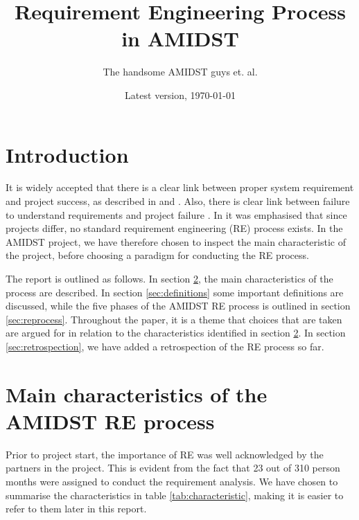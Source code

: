 \documentclass[11pt, oneside]{article}   	%
\title{Requirement Engineering Process in AMIDST}
\author{The handsome AMIDST guys et. al.}
\date{Latest version, \today}							%
\begin{document}
\maketitle
%
%
\section{Introduction}

It is widely accepted that there is a clear link between proper system requirement and project success, as described in  \cite{Boe91} and \cite{Jac99}.  Also, there is clear link between failure to understand requirements and project failure \cite{Ewu03}.  
In \cite{Ebe10} it was emphasised that since projects differ, no standard requirement engineering (RE) process exists.  In the AMIDST project, we have therefore chosen to inspect the main characteristic of the project, before choosing a paradigm for conducting the RE process.

The report is outlined as follows.  In section \ref{sec:characteristic}, the main characteristics of the process are described.  In section \ref{sec:definitions} some important definitions are discussed, while the five phases of the AMIDST RE process is outlined in section \ref{sec:reprocess}.  Throughout the paper, it is a theme that choices that are taken are argued for in relation to the characteristics identified in section \ref{sec:characteristic}.  In section \ref{sec:retrospection}, we have added a retrospection of the RE process so far.

\section{Main characteristics of the AMIDST RE process}
\label{sec:characteristic}

Prior to project start, the importance of RE was well acknowledged by the partners in the project.  This is evident from the fact that 23 out of 310 person months were assigned to conduct the requirement analysis.  We have chosen to summarise the characteristics in table \ref{tab:characteristic}, making it is easier to refer to them later in this report.
\end{document}
